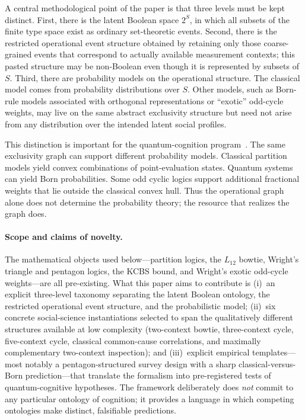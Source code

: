 \documentclass[aps,pra,twocolumn,superscriptaddress,floatfix,longbibliography]{revtex4-2}
\begin{document}
A central methodological point of the paper is that three levels
must be kept distinct. First, there is the latent Boolean space
$2^S$, in which all subsets of the finite type space exist as
ordinary set-theoretic events. Second, there is the restricted
operational event structure obtained by retaining only those
coarse-grained events that correspond to actually available
measurement contexts; this pasted structure may be non-Boolean even
though it is represented by subsets of $S$. Third, there are
probability models on the operational structure. The classical model
comes from probability distributions over $S$. Other models, such as
Born-rule models associated with orthogonal representations or
``exotic'' odd-cycle weights, may live on the same abstract
exclusivity structure but need not arise from any distribution over
the intended latent social profiles.

This distinction is important for the quantum-cognition
program~\cite{Busemeyer2012,Pothos2013}. The same exclusivity graph
can support different probability models. Classical partition
models yield convex combinations of point-evaluation states. Quantum
systems can yield Born probabilities. Some odd cyclic logics support
additional fractional weights that lie outside the classical convex
hull. Thus the operational graph alone does not determine the
probability theory; the resource that realizes the graph does.

\paragraph{Scope and claims of novelty.}
The mathematical objects used below---partition logics, the $L_{12}$
bowtie, Wright's triangle and pentagon logics, the KCBS bound, and
Wright's exotic odd-cycle weights---are all pre-existing. What this
paper aims to contribute is (i)~an explicit three-level taxonomy
separating the latent Boolean ontology, the restricted operational
event structure, and the probabilistic model; (ii)~six concrete
social-science instantiations selected to span the qualitatively
different structures available at low complexity (two-context
bowtie, three-context cycle, five-context cycle, classical
common-cause correlations, and maximally complementary two-context
inspection); and (iii)~explicit empirical templates---most notably a
pentagon-structured survey design with a sharp classical-versus-Born
prediction---that translate the formalism into pre-registered tests
of quantum-cognitive hypotheses. The framework deliberately does
\emph{not} commit to any particular ontology of cognition; it
provides a language in which competing ontologies make distinct,
falsifiable predictions.
\end{document}
